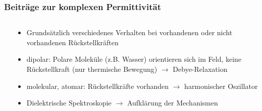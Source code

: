          \begin{frame}
           \frametitle{Beiträge zur komplexen Permittivität}
           \begin{columns}[t]
             \begin{column}{.6\textwidth}
               
               \centering
             \end{column}
             \begin{column}{.4\textwidth}
               \begin{itemize}[<+->]
                 \item Grundsätzlich verschiedenes Verhalten bei
                   vorhandenen oder nicht vorhandenen Rückstellkräften
                   \item dipolar: Polare Moleküle (z.B. Wasser)
                     orientieren sich im Feld, keine Rückstellkraft
                     (nur thermische Bewegung) $\to$ Debye-Relaxation
                     \item molekular, atomar: Rückstellkräfte
                       vorhanden $\to$ harmonischer Oszillator
                       \item Dielektrische Spektroskopie $\to$
                         Aufklärung der Mechanismen
                 \end{itemize}
             \end{column}
           \end{columns}
         \end{frame}


